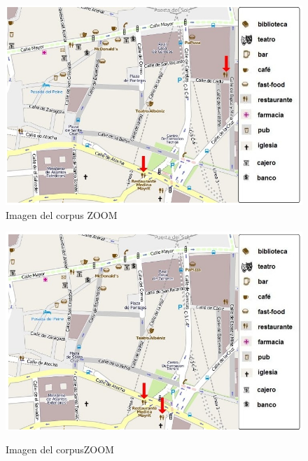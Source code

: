 \begin{figure}
\begin{minipage}[b]{0.5\linewidth}
\centering
\includegraphics[width=\textwidth]{images/corpus/mapa9.png}\\[0pt]
\caption{Imagen del corpus ZOOM}
\label{mapa9}
\end{minipage}
\hspace*{0cm}
\begin{minipage}[b]{0.5\linewidth}
\centering
\includegraphics[width=\textwidth]{images/corpus/mapa10.png}\\[0pt]
\caption{Imagen del corpusZOOM}
\label{mapa10}
\end{minipage}
\end{figure}

